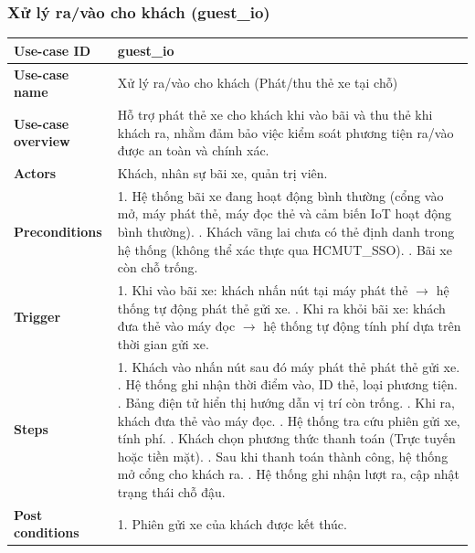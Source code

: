\subsubsection{Xử lý ra/vào cho khách (guest\_io)}
\begingroup
\small
\begin{longtable}{|>{\centering\arraybackslash}m{3cm}|m{13.7cm}|}
\hline
\textbf{Use-case ID} & guest\_io \\ \hline
\textbf{Use-case name} & Xử lý ra/vào cho khách (Phát/thu thẻ xe tại chỗ) \\ \hline
\textbf{Use-case overview} & Hỗ trợ phát thẻ xe cho khách khi vào bãi và thu thẻ khi khách ra, nhằm đảm bảo việc kiểm soát phương tiện ra/vào được an toàn và chính xác. \\ \hline
\textbf{Actors} & Khách, nhân sự bãi xe, quản trị viên. \\ \hline
\textbf{Preconditions} & 
1. Hệ thống bãi xe đang hoạt động bình thường (cổng vào mở, máy phát thẻ, máy đọc thẻ và cảm biến IoT hoạt động bình thường). \newline
2. Khách vãng lai chưa có thẻ định danh trong hệ thống (không thể xác thực qua HCMUT\_SSO). \newline
3. Bãi xe còn chỗ trống. \\ \hline
\textbf{Trigger} & 
1. Khi vào bãi xe: khách nhấn nút tại máy phát thẻ $\rightarrow$ hệ thống tự động phát thẻ gửi xe. \newline
2. Khi ra khỏi bãi xe: khách đưa thẻ vào máy đọc $\rightarrow$ hệ thống tự động tính phí dựa trên thời gian gửi xe. \\ \hline
\textbf{Steps} & 
1. Khách vào nhấn nút sau đó máy phát thẻ phát thẻ gửi xe. \newline
2. Hệ thống ghi nhận thời điểm vào, ID thẻ, loại phương tiện. \newline
3. Bảng điện tử hiển thị hướng dẫn vị trí còn trống. \newline
4. Khi ra, khách đưa thẻ vào máy đọc. \newline
5. Hệ thống tra cứu phiên gửi xe, tính phí. \newline
6. Khách chọn phương thức thanh toán (Trực tuyến hoặc tiền mặt). \newline
7. Sau khi thanh toán thành công, hệ thống mở cổng cho khách ra. \newline
8. Hệ thống ghi nhận lượt ra, cập nhật trạng thái chỗ đậu. \\ \hline
\textbf{Post conditions} & 
1. Phiên gửi xe của khách được kết thúc. \newline

\end{longtable}
